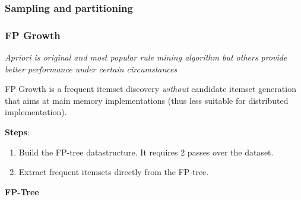   \subsubsection{Sampling and partitioning} %
  \label{ssub:partitioning}
  \subsubsection{FP Growth} %
  \label{ssub:fp_growth}
    \emph{Apriori is original and most popular rule mining algorithm but others provide better performance under certain circumstances}

    FP Growth is a frequent itemset discovery \emph{without} candidate itemset generation that aims at main memory implementations (thus less suitable for distributed implementation).

    \textbf{Steps}:
    \begin{enumerate}
      \item Build the FP-tree datastructure. It requires 2 passes over the dataset.
      \item Extract frequent itemsets directly from the FP-tree.
    \end{enumerate}

    \textbf{FP-Tree}
